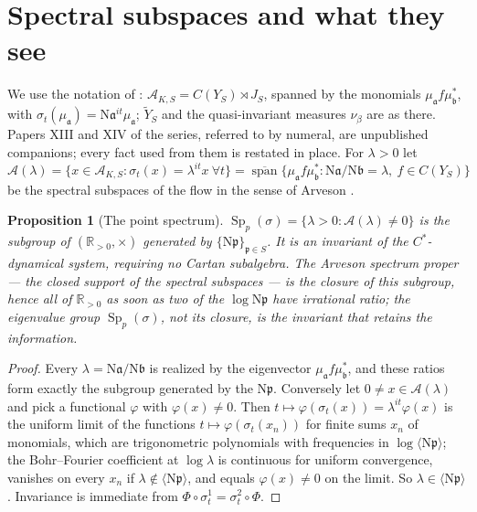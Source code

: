 \documentclass[11pt]{amsart}
\numberwithin{equation}{section}
\newtheorem{proposition}[theorem]{Proposition}
\theoremstyle{definition}
\theoremstyle{remark}
\newcommand{\R}{\mathbb{R}}
\newcommand{\cA}{\mathcal{A}}
\newcommand{\pp}{\mathfrak{p}}
\newcommand{\aaa}{\mathfrak{a}}
\newcommand{\bb}{\mathfrak{b}}
\newcommand{\Ns}{\mathrm{N}}
\newcommand{\Sp}{\operatorname{Sp}}
\newcommand{\spn}{\operatorname{span}}
\begin{document}
\maketitle

\section{Spectral subspaces and what they see}

We use the notation of \cite{Main}: $\cA_{K,S}=C(Y_S)\rtimes J_S$, spanned by the monomials
$\mu_\aaa f\mu_\bb^*$, with $\sigma_t(\mu_\aaa)=\Ns\aaa^{it}\mu_\aaa$; $\widetilde Y_S$ and
the quasi-invariant measures $\nu_\beta$ are as there. Papers XIII and XIV of the series,
referred to by numeral, are unpublished companions; every fact used from them is restated in
place. For $\lambda>0$ let
\[
\cA(\lambda)=\bigl\{x\in\cA_{K,S}:\sigma_t(x)=\lambda^{it}x\ \forall t\bigr\}
=\overline{\spn}\bigl\{\mu_\aaa f\mu_\bb^*:\Ns\aaa/\Ns\bb=\lambda,\ f\in C(Y_S)\bigr\}
\]
be the spectral subspaces of the flow in the sense of Arveson \cite{Arveson}.

\begin{proposition}[The point spectrum]\label{prop:spectrum}
$\Sp_p(\sigma)=\{\lambda>0:\cA(\lambda)\ne0\}$ is the subgroup of $(\R_{>0},\times)$ generated
by $\{\Ns\pp\}_{\pp\in S}$. It is an invariant of the $C^*$-dynamical system, requiring no
Cartan subalgebra. The Arveson spectrum proper --- the closed support of the spectral
subspaces --- is the closure of this subgroup, hence all of $\R_{>0}$ as soon as two of the
$\log\Ns\pp$ have irrational ratio; the eigenvalue group $\Sp_p(\sigma)$, not its closure, is
the invariant that retains the information.
\end{proposition}

\begin{proof}
Every $\lambda=\Ns\aaa/\Ns\bb$ is realized by the eigenvector $\mu_\aaa f\mu_\bb^*$, and these
ratios form exactly the subgroup generated by the $\Ns\pp$. Conversely let
$0\ne x\in\cA(\lambda)$ and pick a functional $\varphi$ with $\varphi(x)\ne0$. Then
$t\mapsto\varphi(\sigma_t(x))=\lambda^{it}\varphi(x)$ is the uniform limit of the functions
$t\mapsto\varphi(\sigma_t(x_n))$ for finite sums $x_n$ of monomials, which are trigonometric
polynomials with frequencies in $\log\bigl\langle\Ns\pp\bigr\rangle$; the Bohr--Fourier
coefficient at $\log\lambda$ is continuous for uniform convergence, vanishes on every $x_n$
if $\lambda\notin\langle\Ns\pp\rangle$, and equals $\varphi(x)\ne0$ on the limit. So
$\lambda\in\langle\Ns\pp\rangle$. Invariance is immediate from
$\Phi\circ\sigma^1_t=\sigma^2_t\circ\Phi$.
\end{proof}
\end{document}
